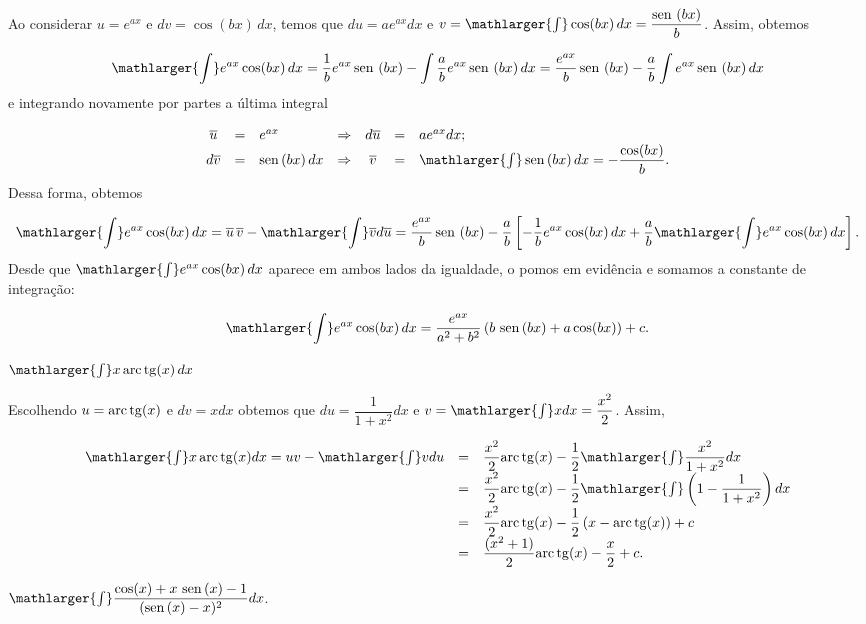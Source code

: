 \cleardoublepage\documentclass[../main.tex]{subfiles}
\begin{document}
\begin{exeresol}
\begin{compactenum}[a)]
  \begin{solution}
  Ao considerar \(u= e^{ax}\) e \(dv =\cos( bx)\, dx\), temos que \(du= ae^{ax}dx\) e \(v=\mathlarger{\int}\cos( bx)\, dx=\dfrac{\sen\,(bx)}{b}\). Assim, obtemos

\[ \mathlarger{\int}e^{ax} \cos( bx) \,dx= \dfrac{1}{b}e^{ax} \sen\, ( bx) - \int\dfrac{a}{b} e^{ax}\sen\, ( bx)\, dx= \dfrac{e^{ax}}{b} \sen\, ( bx) -\dfrac{a}{b}\int e^{ax}\sen\, ( bx)\, dx \]
e integrando novamente por partes a última integral

\[ \begin{array}{cclcccl} \overline{u} &=&e^{ax}&\Rightarrow &d\overline{u} &=& ae^{ax}dx;\\ d\overline{v} &=&\sen( bx)\, dx &\Rightarrow&\overline{v} &=& \mathlarger{\int}\sen( bx)\, dx=-\dfrac{\cos(bx)}{b} . \end{array} \]
Dessa forma, obtemos

\[ \mathlarger{\int}e^{ax} \cos( bx) \,dx= \overline{u} \,\overline{v}-\mathlarger{\int} \overline{v} d\overline{u} = \dfrac{e^{ax}}{b} \sen\, ( bx) -\dfrac{a}{b} \left[ -\dfrac{1}{b} e^{ax}\cos( bx)\, dx + \dfrac{a}{b} \mathlarger{\int}e^{ax} \cos( bx) \,dx \right]. \]
Desde que \(\mathlarger{\int}e^{ax} \cos( bx) \,dx\) aparece em ambos lados da igualdade, o pomos em evidência e somamos a constante de integração:

\[ \mathlarger{\int}e^{ax} \cos( bx) \,dx = \dfrac{e^{ax}}{a^2 +b^2}\left(b\,\sen(bx) +a \cos( bx) \right)+c. \]
  \end{solution}
 \item \(\mathlarger{\int} x\,{\rm arc\,tg} (x)\, dx\)
 
 \begin{solution}
 Escolhendo \(u={\rm arc\,tg} (x)\) e \(dv= xdx\) obtemos que \(du=\dfrac{1}{1+x^2}dx\) e \(v=\mathlarger{\int}xdx=\dfrac{x^2}{2}\). Assim,

\[ \begin{array}{rcl} \mathlarger{\int} x\,{\rm arc\,tg} (x) dx = uv-\mathlarger{\int} v du &=&\dfrac{x^2}{2} {\rm arc\,tg} (x) - \dfrac{1}{2} \mathlarger{\int} \dfrac{x^2}{1+x^2}dx\\ &=&\dfrac{x^2}{2} {\rm arc\,tg} (x) - \dfrac{1}{2} \mathlarger{\int} \left(1- \dfrac{1}{1+x^2}\right)dx\\ &=&\dfrac{x^2}{2} {\rm arc\,tg} (x) - \dfrac{1}{2} \left(x- {\rm arc\,tg} (x) \right)+c\\ &=&\dfrac{(x^2+1)}{2} {\rm arc\,tg} ( x) - \dfrac{x}{2}+c. \end{array} \]
 \end{solution}
 \item \(\mathlarger{\int} \dfrac{\cos (x) + x\,\sen(x) -1}{(\sen (x) -x)^2} dx\).
 

\end{compactenum}
\end{exeresol}
\end{document}
